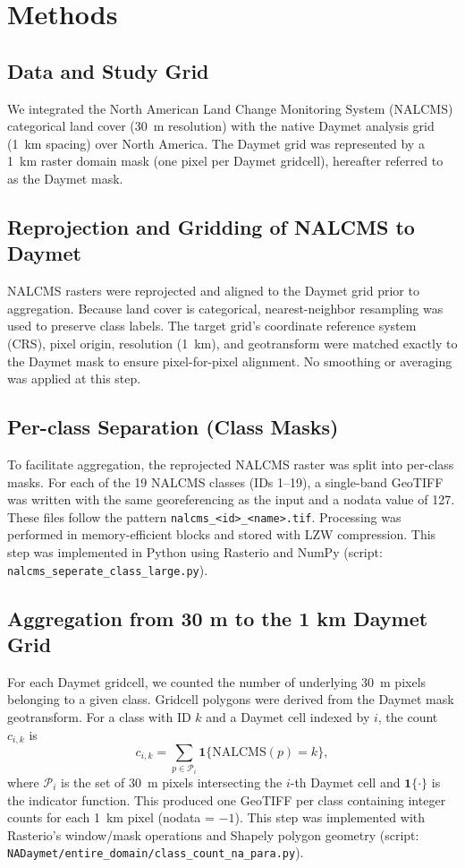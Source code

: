 \section{Methods}

\subsection{Data and Study Grid}
We integrated the North American Land Change Monitoring System (NALCMS) categorical land cover (30~m resolution) with the native Daymet analysis grid (1~km spacing) over North America. The Daymet grid was represented by a 1~km raster domain mask (one pixel per Daymet gridcell), hereafter referred to as the Daymet mask.

\subsection{Reprojection and Gridding of NALCMS to Daymet}
NALCMS rasters were reprojected and aligned to the Daymet grid prior to aggregation. Because land cover is categorical, nearest-neighbor resampling was used to preserve class labels. The target grid's coordinate reference system (CRS), pixel origin, resolution (1~km), and geotransform were matched exactly to the Daymet mask to ensure pixel-for-pixel alignment. No smoothing or averaging was applied at this step.

\subsection{Per-class Separation (Class Masks)}
To facilitate aggregation, the reprojected NALCMS raster was split into per-class masks. For each of the 19 NALCMS classes (IDs 1--19), a single-band GeoTIFF was written with the same georeferencing as the input and a nodata value of 127. These files follow the pattern \texttt{nalcms\_\textless id\textgreater\_\textless name\textgreater.tif}. Processing was performed in memory-efficient blocks and stored with LZW compression. This step was implemented in Python using Rasterio and NumPy (script: \texttt{nalcms\_seperate\_class\_large.py}).

\subsection{Aggregation from 30 m to the 1 km Daymet Grid}
For each Daymet gridcell, we counted the number of underlying 30~m pixels belonging to a given class. Gridcell polygons were derived from the Daymet mask geotransform. For a class with ID \(k\) and a Daymet cell indexed by \(i\), the count \(c_{i,k}\) is
\[
  c_{i,k} = \sum_{p \in \mathcal{P}_i} \mathbf{1}\{ \text{NALCMS}(p) = k \},
\]
where \(\mathcal{P}_i\) is the set of 30~m pixels intersecting the \(i\)-th Daymet cell and \(\mathbf{1}\{\cdot\}\) is the indicator function. This produced one GeoTIFF per class containing integer counts for each 1~km pixel (nodata = \(-1\)). This step was implemented with Rasterio's window/mask operations and Shapely polygon geometry (script: \texttt{NADaymet/entire\_domain/class\_count\_na\_para.py}).

